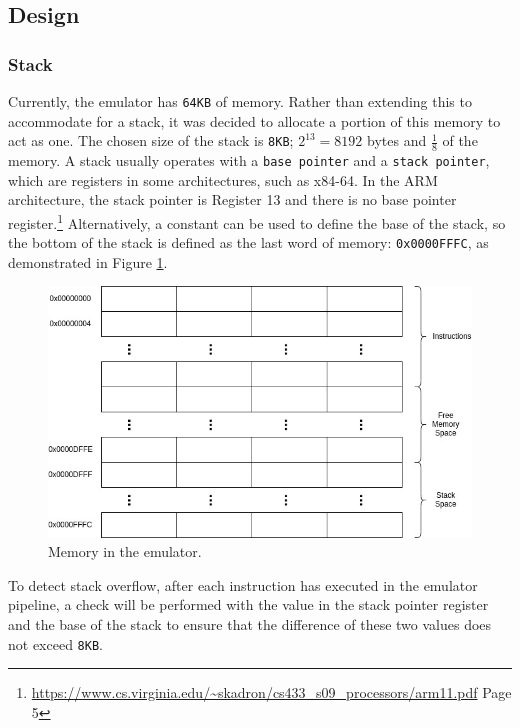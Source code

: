 \documentclass[11pt]{article}
\begin{document}
\subsection{Design}

\subsubsection{Stack}

Currently, the emulator has \texttt{64KB} of memory. Rather than extending this to accommodate for a stack, it was decided to allocate a portion of this memory to act as one. The chosen size of the stack is \texttt{8KB}; $2^{13} = 8192$  bytes and $\frac{1}{8}$ of the memory. 
A stack usually operates with a \texttt{base pointer} and a \texttt{stack pointer}, which are registers in some architectures, such as x84-64. In the ARM architecture, the stack pointer is Register 13 and there is no base pointer register.\footnote{\label{stackpointerfoot} \url{https://www.cs.virginia.edu/~skadron/cs433\_s09\_processors/arm11.pdf} Page 5} Alternatively, a constant can be used to define the base of the stack, so the bottom of the stack is defined as the last word of memory: \texttt{0x0000FFFC}, as demonstrated in Figure \ref{fig:memory}.

\begin{figure}[h!]
	\includegraphics[width=\linewidth]{memory.jpg}
	\caption{Memory in the emulator.}
	\label{fig:memory}
\end{figure}

To detect stack overflow, after each instruction has executed in the emulator pipeline, a check will be performed with the value in the stack pointer register and the base of the stack to ensure that the difference of these two values does not exceed \texttt{8KB}.
\end{document}
